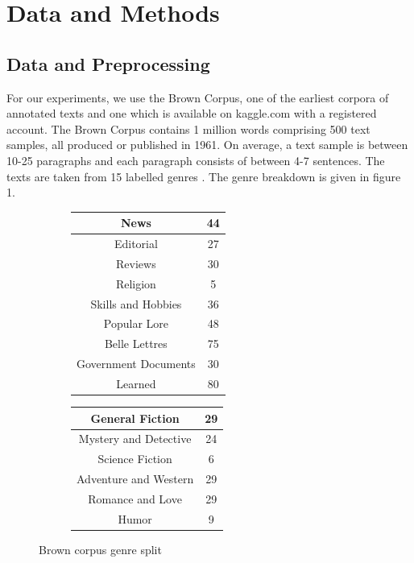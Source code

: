 \documentclass{article}
\begin{document}
\section{Data and Methods}
\subsection{Data and Preprocessing}
For our experiments, we use the Brown Corpus, one of the earliest corpora of annotated texts and one which is available on kaggle.com with a registered account. The Brown Corpus contains 1 million words comprising 500 text samples, all produced or published in 1961. On average, a text sample is between 10-25 paragraphs and each paragraph consists of between 4-7 sentences. The texts are taken from 15 labelled genres \cite{BrownManual}. The genre breakdown is given in figure 1.
\begin{figure}[ht!]
\centering
\begin{subfigure}[T]{0.3\linewidth}
\begin{tabular}{|c|c|}
\hline
News & 44\\
\hline
Editorial & 27\\
\hline
Reviews & 30\\
\hline
Religion & 5\\
\hline
Skills and Hobbies & 36\\
\hline
Popular Lore & 48\\
\hline
Belle Lettres & 75\\
\hline
Government Documents & 30\\
\hline
Learned & 80\\
\hline
\end{tabular}
\end{subfigure}
\begin{subfigure}[T]{0.3\linewidth}
\begin{tabular}{|c|c|}
\hline
General Fiction & 29\\
\hline
Mystery and Detective & 24\\
\hline
Science Fiction & 6\\
\hline
Adventure and Western & 29\\
\hline
Romance and Love & 29\\
\hline
Humor & 9\\
\hline
\end{tabular}
\end{subfigure}
\caption{Brown corpus genre split}
\end{figure}
\end{document}
